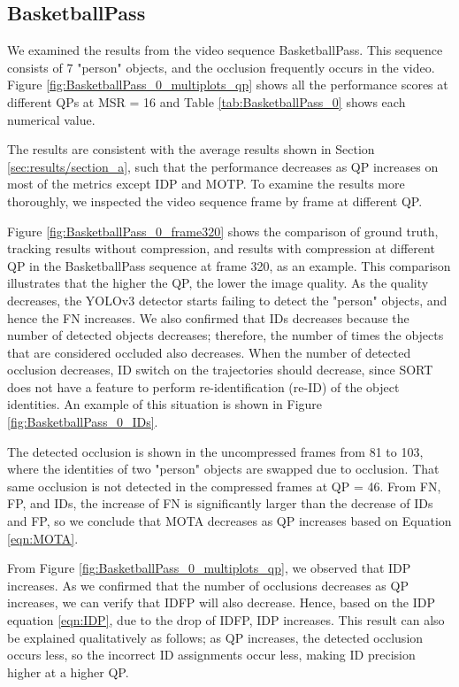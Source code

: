 \subsection{BasketballPass}
We examined the results from the video sequence BasketballPass. This sequence consists of 7 "person" objects, and the occlusion frequently occurs in the video. Figure \ref{fig:BasketballPass_0_multiplots_qp} shows all the performance scores at different QPs at MSR = 16 and Table \ref{tab:BasketballPass_0} shows each numerical value. 


The results are consistent with the average results shown in Section \ref{sec:results/section_a}, such that the performance decreases as QP increases on most of the metrics except IDP and MOTP. To examine the results more thoroughly, we inspected the video sequence frame by frame at different QP.

Figure \ref{fig:BasketballPass_0_frame320} shows the comparison of ground truth, tracking results without compression, and results with compression at different QP in the BasketballPass sequence at frame 320, as an example. This comparison illustrates that the higher the QP, the lower the image quality. As the quality decreases, the YOLOv3 detector starts failing to detect the "person" objects, and hence the FN increases. We also confirmed that IDs decreases because the number of detected objects decreases; therefore, the number of times the objects that are considered occluded also decreases. When the number of detected occlusion decreases, ID switch on the trajectories should decrease, since SORT does not have a feature to perform re-identification (re-ID) of the object identities. An example of this situation is shown in Figure \ref{fig:BasketballPass_0_IDs}.

The detected occlusion is shown in the uncompressed frames from 81 to 103, where the identities of two "person" objects are swapped due to occlusion. That same occlusion is not detected in the compressed frames at QP = 46. From FN, FP, and IDs, the increase of FN is significantly larger than the decrease of IDs and FP, so we conclude that MOTA decreases as QP increases based on Equation \eqref{eqn:MOTA}. 

From Figure \ref{fig:BasketballPass_0_multiplots_qp}, we observed that IDP increases. As we confirmed that the number of occlusions decreases as QP increases, we can verify that IDFP will also decrease. Hence, based on the IDP equation \eqref{eqn:IDP}, due to the drop of IDFP, IDP increases. This result can also be explained qualitatively as follows; as QP increases, the detected occlusion occurs less, so the incorrect ID assignments occur less, making ID precision higher at a higher QP.

